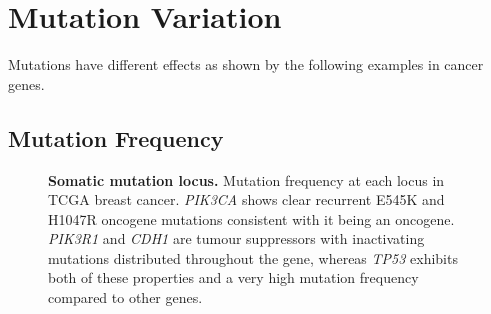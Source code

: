 \iffalse
\clearpage
\section{Mutation Variation} \label{appendix:mutation_analysis}
Mutations have different effects as shown by the following examples in cancer genes.

\subsection{Mutation Frequency}


\begin{figure}[!ht]
        \begin{center}
%
    \end{center}
    \caption[Somatic mutation locus]{\small \textbf{Somatic mutation locus.} Mutation frequency at each locus in \gls{TCGA} breast cancer. \textit{PIK3CA} shows clear recurrent E545K and H1047R oncogene mutations consistent with it being an oncogene. \textit{PIK3R1} and \textit{CDH1} are tumour suppressors with inactivating mutations distributed throughout the gene, whereas \textit{TP53} exhibits both of these properties and a very high mutation frequency compared to other genes.
}
\label{fig:mutation_locus}
\end{figure}
